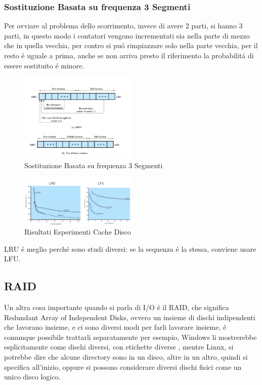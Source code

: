 \subsubsection*{Sostituzione Basata su frequenza 3 Segmenti}
Per ovviare al problema dello scorrimento, invece di avere 2 parti, si hanno 3 parti, in questo modo i contatori vengono incrementati
sia nella parte di mezzo che in quella vecchia, per contro si puó rimpiazzare solo nella parte vecchia, per il resto é uguale
a prima, anche se non arriva presto il riferimento la probabilitá di essere sostituito é minore.
\begin{figure}[H]
    \centering
    \includegraphics[width=0.5\textwidth]{immagini/sostituzione-3-segmenti}
    \caption{Sostituzione Basata su frequenza 3 Segmenti}
\end{figure}
\begin{figure}[H]
    \centering
    \includegraphics[width=0.5\textwidth]{immagini/RisultatiEsperimentiCacheDisco}
    \caption{Risultati Esperimenti Cache Disco}
\end{figure}
LRU é meglio perché sono studi diversi: se la sequenza é la stessa, conviene usare LFU.
\subsection{RAID}
Un altra cosa importante quando si parla di I/O é il RAID, che significa Redundant Array of Independent Disks, ovvero
un insieme di dischi indipendenti che lavorano insieme, e ci sono diversi modi per farli lavorare insieme, é comunque
possibile trattarli separatamente per esempio, Windows li mostrerebbe esplicitamente come dischi diversi, con etichette diverse
, mentre Linux, si potrebbe dire che alcune directory sono in un disco, altre in un altro, quindi si specifica all'inizio, oppure
si possono considerare diversi dischi fisici come un unico disco logico.
